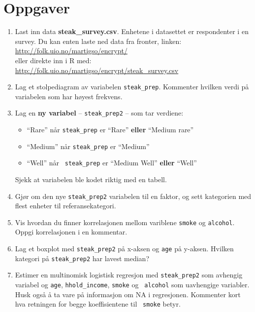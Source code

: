\documentclass[12pt]{article}
\begin{document}
\section*{Oppgaver}
\begin{enumerate}

\item Last inn data \textbf{steak{\_}survey.csv}. Enhetene i datasettet er respondenter i en survey. Du kan enten laste ned data fra fronter, linken: \\
\url{http://folk.uio.no/martigso/encrypt/} \\
eller direkte inn i R med: \\
\url{http://folk.uio.no/martigso/encrypt/steak_survey.csv}

\item Lag et stolpediagram av variabelen {\tt steak{\_}prep}. Kommenter hvilken verdi på variabelen som har høyest frekvens.

\item Lag en \textbf{ny variabel} -- {\tt steak{\_}prep2} -- som tar verdiene: \\
  \begin{itemize}
    \item ``Rare'' når {\tt steak{\_}prep} er ``Rare'' \textbf{eller} ``Medium rare''
    \item ``Medium'' når {\tt steak{\_}prep} er ``Medium''
    \item ``Well'' når {\tt
    steak{\_}prep} er ``Medium Well'' \textbf{eller} ``Well''
  \end{itemize}
Sjekk at variabelen ble kodet riktig med en tabell.

\item Gjør om den nye {\tt steak{\_}prep2} variabelen til en faktor, og sett
kategorien med flest enheter til referansekategori.

\item Vis hvordan du finner korrelasjonen mellom variblene {\tt smoke} og {\tt alcohol}. Oppgi korrelasjonen i en kommentar.

\item Lag et boxplot med {\tt steak{\_}prep2} på x-aksen og {\tt age} på y-aksen.
Hvilken kategori på {\tt steak{\_}prep2} har lavest median?

\item Estimer en multinomisk logistisk regresjon med {\tt steak{\_}prep2} som
avhengig variabel og {\tt age}, {\tt hhold{\_}income}, {\tt smoke} og {\tt
alcohol} som uavhengige variabler. Husk også å ta vare på informasjon om NA i
regresjonen. Kommenter kort hva retningen for begge koeffisientene til {\tt
smoke} betyr.


\end{enumerate}
\end{document}
